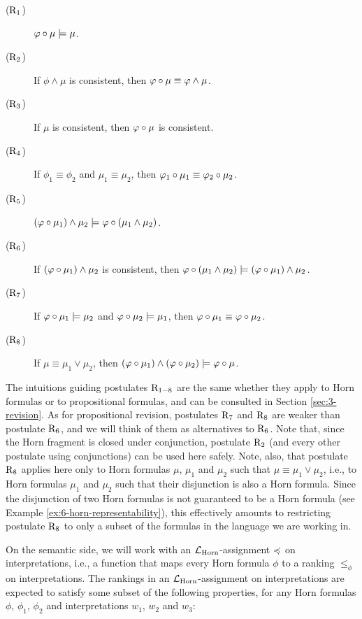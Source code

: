 \begin{description}
	\item[($\mathrm{R}_{1}$)] $\varphi\circ\mu\models\mu$.
	\item[($\mathrm{R}_{2}$)] If $\phi\land\mu$ is consistent, 
		then $\varphi\circ\mu\equiv\varphi\land\mu$.
	\item[($\mathrm{R}_{3}$)] If $\mu$ is consistent, then $\varphi\circ\mu$ is consistent.
	\item[($\mathrm{R}_{4}$)] If $\phi_1\equiv\phi_2$ and $\mu_1\equiv\mu_2$, then 						
		$\varphi_1\circ\mu_1\equiv\varphi_2\circ\mu_2$.
	\item[($\mathrm{R}_{5}$)] $(\varphi\circ\mu_1)\land\mu_2\models\varphi\circ(\mu_1\land\mu_2)$.
	\item[($\mathrm{R}_{6}$)] If $(\varphi\circ\mu_1)\land\mu_2$ is consistent, 
		then $\varphi\circ(\mu_1\land\mu_2)\models(\varphi\circ\mu_1)\land\mu_2$.
	\item[($\mathrm{R}_{7}$)] If $\varphi\circ\mu_1\models\mu_2$ and $\varphi\circ\mu_2\models\mu_1$,
		then $\varphi\circ\mu_1\equiv\varphi\circ\mu_2$.
	\item[($\mathrm{R}_{8}$)] If $\mu\equiv \mu_{1}\lor\mu_{2}$,
		then $(\varphi\circ\mu_1)\land(\varphi\circ\mu_2)\models\varphi\circ\mu$.
\end{description}

The intuitions guiding postulates $\mathrm{R}_{1-8}$ are the same 
whether they apply to Horn formulas or to 
propositional formulas, and can be consulted in Section \ref{sec:3-revision}.
As for propositional revision, postulates $\mathrm{R}_{7}$ and $\mathrm{R}_{8}$ are weaker than postulate $\mathrm{R}_{6}$,
and we will think of them as alternatives to $\mathrm{R}_{6}$.
Note that, since the Horn fragment is closed under conjunction,
postulate $\mathrm{R}_{2}$ (and every other postulate using conjunctions)
can be used here safely.
Note, also, that postulate $\mathrm{R}_{8}$ applies here only to Horn formulas 
$\mu$, $\mu_{1}$ and $\mu_{2}$ such that $\mu\equiv \mu_{1}\lor \mu_{2}$,
i.e., to Horn formulas $\mu_{1}$ and $\mu_{2}$ 
such that their disjunction is also a Horn formula. 
Since the disjunction of two Horn formulas is not guaranteed to be a Horn formula
(see Example \ref{ex:6-horn-representability}),
this effectively amounts to restricting postulate $\mathrm{R}_{8}$ 
to only a subset of the formulas in the language we are working in.

On the semantic side, we will work with an 
$\mathcal{L}_{\mathrm{Horn}}$-assignment $\preccurlyeq$ on interpretations,
i.e., a function that maps every Horn formula $\phi$ to a ranking $\le_{\phi}$ on interpretations.
The rankings in an $\mathcal{L}_{\mathrm{Horn}}$-assignment on interpretations
are expected to satisfy some subset of the following properties,
for any Horn formulas $\phi$, $\phi_1$, $\phi_2$
and interpretations $w_1$, $w_2$ and $w_3$:

